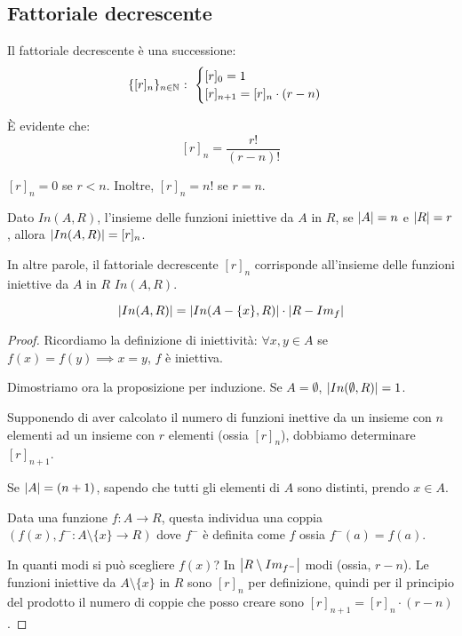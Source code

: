 \subsection{Fattoriale decrescente}

\begin{defn}
Il fattoriale decrescente \`e una successione:
\begin{equation}
\{[r]_n\}_{n \in \mathbb{N}} \text{ : }
\begin{cases}
[r]_0 = 1 \\
[r]_{n+1} = [r]_n \cdot (r - n)
\end{cases}
\end{equation}
\end{defn}
\`E evidente che:
\[
[r]_n = \frac{r!}{(r-n)!}
\]

\begin{oss}
$[r]_n = 0$ se $r < n$. Inoltre, $[r]_n = n!$ se $r = n$.
\end{oss}

\begin{prop}
Dato $In(A,R)$, l'insieme delle funzioni iniettive da $A$ in $R$, se $\left\lvert{A}\right\rvert = n$ e $\left\lvert{R}\right\rvert = r$, allora $\left\lvert{In (A,R)}\right\rvert = [r]_n$.

In altre parole, il fattoriale decrescente $[r]_n$ corrisponde all'insieme delle funzioni iniettive da $A$ in $R$ $In(A,R)$.

\[
\left\lvert{In(A,R)}\right\rvert = \left\lvert{In (A- \{x\},R)}\right\rvert \cdot \left\lvert{R - Im_f}\right\rvert
\]

\end{prop}
\begin{proof}
Ricordiamo la definizione di iniettivit\`a: $\forall x, y \in A$ se $f(x) = f(y) \implies x = y$, $f$ \`e iniettiva.

Dimostriamo ora la proposizione per induzione. Se $A = \emptyset$, $\left\lvert{In(\emptyset, R)}\right\rvert = 1$.

Supponendo di aver calcolato il numero di funzioni inettive da un insieme con $n$ elementi ad un insieme con $r$ elementi (ossia $[r]_n$), dobbiamo determinare $[r]_{n+1}$.

Se $\left\lvert{A}\right\rvert = (n+1)$, sapendo che tutti gli elementi di $A$ sono distinti, prendo $x \in A$.

Data una funzione $f : A \to R$, questa individua una coppia $(f(x), f^{-} : A \setminus \{ x \} \to R)$ dove $f^{-}$ \`e definita come $f$ ossia $f^{-} (a) = f(a)$.

In quanti modi si pu\`o scegliere $f(x)$? In $\left\lvert{R \setminus Im_{f^-}}\right\rvert$ modi (ossia, $r - n$). Le funzioni iniettive da $A \setminus \{ x \}$ in $R$ sono $[r]_n$ per definizione, quindi per il principio del prodotto il numero di coppie che posso creare sono $[r]_{n+1} = [r]_n \cdot (r - n)$.
\end{proof}

